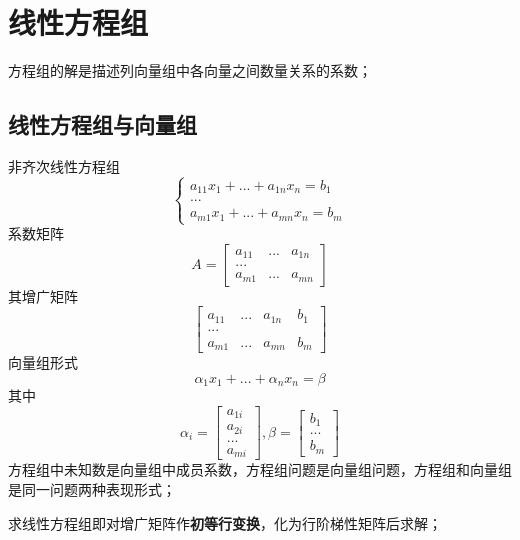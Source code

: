 
\chapter{线性方程组}

方程组的解是描述列向量组中各向量之间数量关系的系数；

\section{线性方程组与向量组}

非齐次线性方程组\[\begin{cases}
    a_{11}x_1 + ... + a_{1n}x_n = b_1 \\ 
    ... \\ 
    a_{m1}x_1 + ... + a_{mn}x_n = b_m
\end{cases}\]
系数矩阵\[A = \begin{bmatrix}
    a_{11} & ... & a_{1n} \\ 
    ... \\ 
    a_{m1} & ... & a_{mn}
\end{bmatrix}\]
其增广矩阵\[\begin{bmatrix}
    a_{11} & ... & a_{1n} & b_1 \\ 
    ... \\ 
    a_{m1} & ... & a_{mn} & b_m
\end{bmatrix}\]
向量组形式
\[\alpha_1x_1 + ... + \alpha_nx_n = \beta\]
其中\[\alpha_i = \begin{bmatrix}
    a_{1i} \\ 
    a_{2i} \\
    ... \\ 
    a_{mi}
\end{bmatrix}, \beta = \begin{bmatrix}
    b_1 \\ 
    ... \\ 
    b_m
\end{bmatrix}\]
方程组中未知数是向量组中成员系数，方程组问题是向量组问题，方程组和向量组是同一问题两种表现形式；

求线性方程组即对增广矩阵作\textbf{初等行变换}，化为行阶梯性矩阵后求解；


